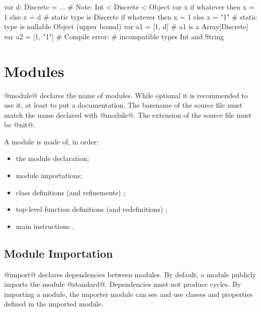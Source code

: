 \begin{lst}
var d: Discrete = ...
# Note: Int < Discrete < Object
var x
if whatever then x = 1 else x = d
# static type is Discrete
if whatever then x = 1 else x = "1"
# static type is nullable Object (upper bound)
var a1 = [1, d] # a1 is a Array[Discrete]
var a2 = [1, "1"] # Compile error:
		# incompatible types Int and String 
\end{lst}


\section{Modules}\label{module}

@module@ declares the name of modules.
While optional it is recommended to use it, at least to put a documentation.
The basename of the source file must match the name declared with @module@.
The extension of the source file must be @nit@.

A module is made of, in order:
\begin{itemize}
\item the module declaration;
\item module importations;
\item class definitions (and refinements) ;
\item top-level function definitions (and redefinitions) ;
\item main instructions .
\end{itemize}

\subsection{Module Importation}\label{import}

@import@ declares dependencies between modules.
By default, a module publicly imports the module @standard@.
Dependencies must not produce cycles.
By importing a module, the importer module can see and use classes and properties defined in the imported module.

